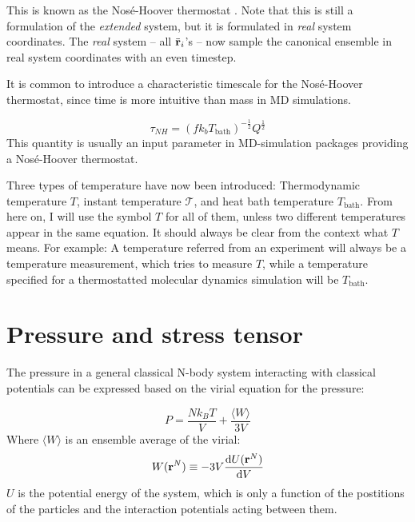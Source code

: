 This is known as the Nosé-Hoover thermostat \cite{PhysRevA.31.1695}. Note that this is still a formulation of the \emph{extended} system, but it is formulated in \emph{real} system coordinates. The \emph{real} system -- all $\ddot{\mathbf{r}}_i$'s -- now sample the canonical ensemble in real system coordinates with an even timestep.

It is common to introduce a characteristic timescale for the Nosé-Hoover thermostat, since time is more intuitive than mass in MD simulations. 

\begin{equation}
	\tau_{NH} = (fk_b T_{\text{bath}})^{-\frac{1}{2}} Q^{\frac{1}{2}}
\end{equation}
This quantity is usually an input parameter in MD-simulation packages providing a Nosé-Hoover thermostat.

Three types of temperature have now been introduced: Thermodynamic temperature $T$, instant temperature $\mathcal{T}$, and heat bath temperature $T_{\text{bath}}$. From here on, I will use the symbol $T$ for all of them, unless two different temperatures appear in the same equation. It should always be clear from the context what $T$ means. For example: A temperature referred from an experiment will always be a temperature measurement, which tries to measure $T$, while a temperature specified for a thermostatted molecular dynamics simulation will be $T_{\text{bath}}$.

\section{Pressure and stress tensor}
The pressure in a general classical N-body system interacting with classical potentials can be expressed based on the virial equation for the pressure:

\begin{equation}
	P = \frac{Nk_BT}{V} + \frac{\langle W \rangle}{3V}
\end{equation}
Where $\langle W \rangle$ is an ensemble average of the virial:
\begin{equation}
	W(\mathbf{r}^N) \equiv -3V\frac{\mathrm{d} U(\mathbf{r}^N)}{\mathrm{d} V}
\end{equation}
$U$ is the potential energy of the system, which is only a function of the postitions of the particles and the interaction potentials acting between them. 

